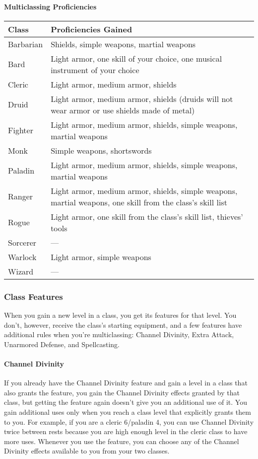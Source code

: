 \documentclass[
]{article}
\begin{document}
\hypertarget{multiclassing-proficiencies}{%
\paragraph{Multiclassing
Proficiencies}\label{multiclassing-proficiencies}}

\begin{longtable}[]{@{}ll@{}}
\toprule
Class & Proficiencies Gained\tabularnewline
\midrule
\endhead
Barbarian & Shields, simple weapons, martial weapons\tabularnewline
Bard & Light armor, one skill of your choice, one musical instrument of
your choice\tabularnewline
Cleric & Light armor, medium armor, shields\tabularnewline
Druid & Light armor, medium armor, shields (druids will not wear armor
or use shields made of metal)\tabularnewline
Fighter & Light armor, medium armor, shields, simple weapons, martial
weapons\tabularnewline
Monk & Simple weapons, shortswords\tabularnewline
Paladin & Light armor, medium armor, shields, simple weapons, martial
weapons\tabularnewline
Ranger & Light armor, medium armor, shields, simple weapons, martial
weapons, one skill from the class's skill list\tabularnewline
Rogue & Light armor, one skill from the class's skill list, thieves'
tools\tabularnewline
Sorcerer & ---\tabularnewline
Warlock & Light armor, simple weapons\tabularnewline
Wizard & ---\tabularnewline
\bottomrule
\end{longtable}

\hypertarget{class-features}{%
\subsubsection{Class Features}\label{class-features}}

When you gain a new level in a class, you get its features for that
level. You don't, however, receive the class's starting equipment, and a
few features have additional rules when you're multiclassing: Channel
Divinity, Extra Attack, Unarmored Defense, and Spellcasting.

\hypertarget{channel-divinity}{%
\paragraph{Channel Divinity}\label{channel-divinity}}

If you already have the Channel Divinity feature and gain a level in a
class that also grants the feature, you gain the Channel Divinity
effects granted by that class, but getting the feature again doesn't
give you an additional use of it. You gain additional uses only when you
reach a class level that explicitly grants them to you. For example, if
you are a cleric 6/paladin 4, you can use Channel Divinity twice between
rests because you are high enough level in the cleric class to have more
uses. Whenever you use the feature, you can choose any of the Channel
Divinity effects available to you from your two classes.
\end{document}
